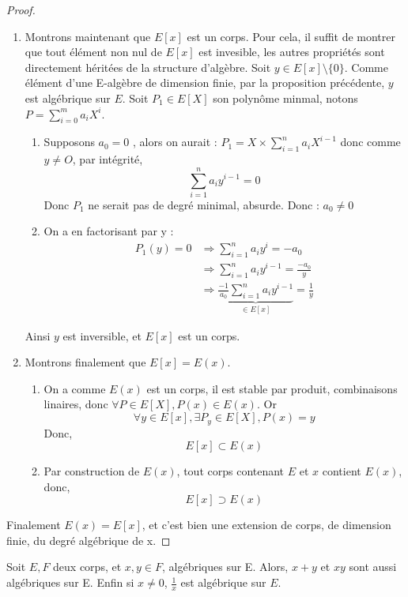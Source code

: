 \documentclass[a4paper,12pt,french]{report}
\begin{document}
\begin{proof}
\begin{enumerate}
		\item Montrons maintenant que $E[x]$ est un corps. Pour cela, il suffit de montrer que tout élément non nul de  $E[x]$ est invesible, les autres propriétés sont directement héritées de la structure d'algèbre.
			Soit $y \in E[x]\setminus\{0\} $. Comme élément d'une E-algèbre de dimension finie, par la proposition précédente, $y$ est algébrique sur $E$. Soit \(P_{1} \in E[X]\) son polynôme minmal, notons \(P = \sum_{i=0}^{m}a_{i}X^{i}\).{}
			\begin{enumerate}
				\item Supposons $a_{0} = 0$ , alors on aurait : $P_{1} = X\times\sum_{i=1}^{n}a_{i}X^{i-1}$ donc comme $y \neq O$, par intégrité,
				\[{}
					\sum_{i=1}^{n}a_{i}y^{i-1} = 0
				\]
				Donc $P_{1}$ ne serait pas de degré minimal, absurde. Donc : $a_{0} \neq 0 $
			
				\item On a en factorisant par y :
				\[{}
					\begin{aligned}
						P_{1}(y) = 0 &\Rightarrow \sum_{i=1}^{n}a_{i}y^{i} = -a_{0}\\
									&\Rightarrow \sum_{i=1}^{n}a_{i}y^{i-1} = \frac{-a_{0}}{y}\\
									&\Rightarrow \underbrace{\frac{-1}{a_{0}}\sum_{i=1}^{n}a_{i}y^{i-1}}_{\in E[x]} = \frac{1}{y}
					\end{aligned}
				\]
			\end{enumerate}
			Ainsi $y$ est inversible, et $E[x]$ est un corps.
			
		\item Montrons finalement que $E[x] = E(x)$. 
			\begin{enumerate}
				\item On a comme $E(x)$ est un corps, il est stable par produit, combinaisons linaires, donc \(\forall P \in E[X], P(x) \in E(x)\). Or \[ \forall y \in E[x], \exists P_{y} \in E[X], P(x) = y \] Donc,  \[E[x] \subset E(x)\]
				\item 
				Par construction de $E(x)$, tout corps contenant $E$ et $x$ contient \(E(x)\), donc, 
				\[ E[x] \supset E(x) \]
			\end{enumerate}
	\end{enumerate}
	Finalement \(E(x) = E[x]\), et c'est bien une extension de corps, de dimension finie, du degré algébrique de x.
				\end{proof}
				
		
		\begin{proposition}
			Soit $E,F$ deux corps, et $x,y \in F$, algébriques sur E. Alors, 
			$x+y$ et $xy$ sont aussi algébriques sur E. Enfin si $x\neq0$, $\frac{1}{x}$ est algébrique sur $E$. 
		\end{proposition}
		
\end{document}
